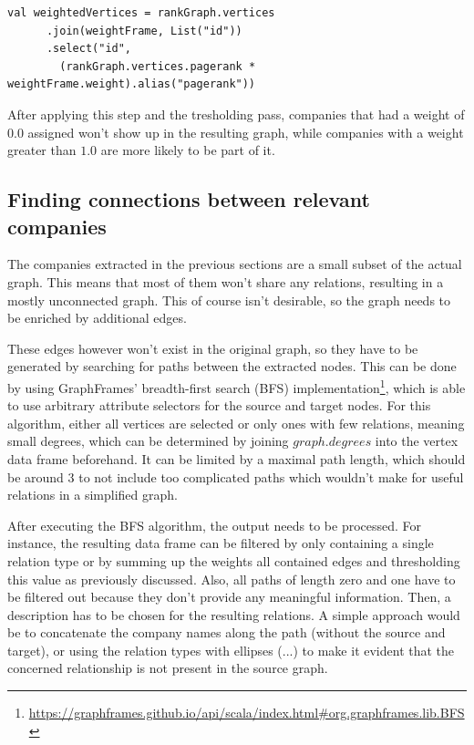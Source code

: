 \documentclass[
        a4paper,     %
        titlepage,   %
        oneside,     %
        parskip      %
        ]{scrartcl}  %
\begin{document}
  \begin{lstlisting}[style=scalaStyle,caption=Custom Weight Joining]
    val weightedVertices = rankGraph.vertices
      .join(weightFrame, List("id"))
      .select("id",
        (rankGraph.vertices.pagerank * weightFrame.weight).alias("pagerank"))
  \end{lstlisting}

  After applying this step and the tresholding pass, companies that had a weight of $0.0$ assigned won't
  show up in the resulting graph, while companies with a weight greater than $1.0$
  are more likely to be part of it.

  \subsection{Finding connections between relevant companies}
  The companies extracted in the previous sections are a small subset of the actual
  graph. This means that most of them won't share any relations, resulting in a
  mostly unconnected graph. This of course isn't desirable, so the graph needs to
  be enriched by additional edges.

  These edges however won't exist in the original graph, so they have to be generated
  by searching for paths between the extracted nodes. This can be done by using
  GraphFrames' breadth-first search (BFS)
  implementation\footnote{\url{https://graphframes.github.io/api/scala/index.html\#org.graphframes.lib.BFS}},
  which is able to use arbitrary attribute selectors for the source and target nodes.
  For this algorithm, either all vertices are selected or only ones with few relations,
  meaning small degrees, which can be determined by joining $graph.degrees$ into the vertex data frame beforehand.
  It can be limited by a maximal path length, which should be around 3 to not
  include too complicated paths which wouldn't make for useful relations in a simplified graph.

  After executing the BFS algorithm, the output needs to be processed. For instance,
  the resulting data frame can be filtered by only containing a single
  relation type or by summing up the weights all contained edges and thresholding
  this value as previously discussed. Also, all paths of length zero and one have to
  be filtered out because they don't provide any meaningful information.
  Then, a description has to be chosen for the resulting relations.
  A simple approach would be to concatenate the company names along the path
  (without the source and target), or using the relation types with ellipses (...) to
  make it evident that the concerned relationship is not present in the source graph.
\end{document}
